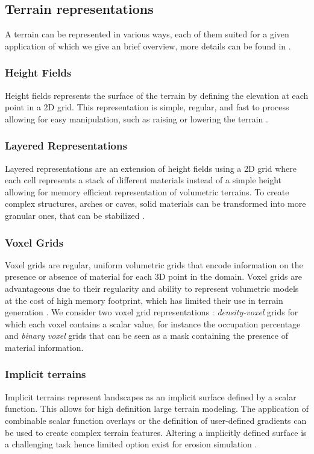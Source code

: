 \subsection{Terrain representations}
A terrain can be represented in various ways, each of them suited for a given application of which we give an brief overview, more details can be found in \cite{Galin2019}.

\subsubsection{Height Fields} 
Height fields represents the surface of the terrain by defining the elevation at each point in a 2D grid. This representation is simple, regular, and fast to process allowing for easy manipulation, such as raising or lowering the terrain \cite{Gain2009, Emilien2015}.

\subsubsection{Layered Representations}
Layered representations are an extension of height fields using a 2D grid where each cell represents a stack of different materials instead of a simple height \cite{Peytavie2009, Benes2001} allowing for memory efficient representation of volumetric terrains. To create complex structures, arches or caves, solid materials can be transformed into more granular ones, that can be stabilized \cite{Peytavie2009}.

\subsubsection{Voxel Grids}
Voxel grids are regular, uniform volumetric grids that encode information on the presence or absence of material for each 3D point in the domain. Voxel grids are advantageous due to their regularity \cite{Dey2018} and ability to represent volumetric models at the cost of high memory footprint, which has limited their use in terrain generation \cite{Ito2003, Kaufman1993, Lengyel2010a}. We consider two voxel grid representations : \textit{density-voxel} grids for which each voxel contains a scalar value, for instance the occupation percentage \cite{Eisemann2008}  and \textit{binary voxel} grids that can be seen as a mask containing the presence of material information.

\subsubsection{Implicit terrains}
Implicit terrains represent landscapes as an implicit surface defined by a scalar function. This allows for high definition large terrain modeling. The application of combinable scalar function overlays \cite{Guerin2016a} or the definition of user-defined gradients \cite{Guerin2022} can be used to create complex terrain features. Altering a implicitly defined surface is a challenging task hence limited option exist for erosion simulation \cite{Paris2019}.

